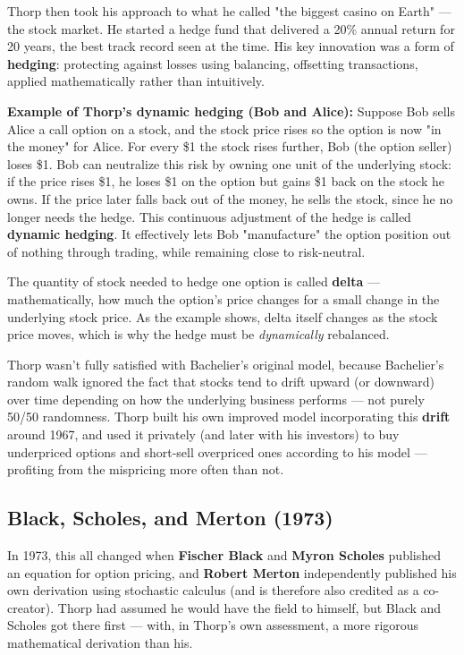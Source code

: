 \documentclass[12pt,openany]{book}
\theoremstyle{definition}
\theoremstyle{remark}
\begin{document}
Thorp then took his approach to what he called "the biggest casino on Earth" --- the stock market. He started a hedge fund that delivered a 20\% annual return for 20 years, the best track record seen at the time. His key innovation was a form of \textbf{hedging}: protecting against losses using balancing, offsetting transactions, applied mathematically rather than intuitively.

\textbf{Example of Thorp's dynamic hedging (Bob and Alice):} Suppose Bob sells Alice a call option on a stock, and the stock price rises so the option is now "in the money" for Alice. For every \$1 the stock rises further, Bob (the option seller) loses \$1. Bob can neutralize this risk by owning one unit of the underlying stock: if the price rises \$1, he loses \$1 on the option but gains \$1 back on the stock he owns. If the price later falls back out of the money, he sells the stock, since he no longer needs the hedge. This continuous adjustment of the hedge is called \textbf{dynamic hedging}. It effectively lets Bob "manufacture" the option position out of nothing through trading, while remaining close to risk-neutral.

The quantity of stock needed to hedge one option is called \textbf{delta} --- mathematically, how much the option's price changes for a small change in the underlying stock price. As the example shows, delta itself changes as the stock price moves, which is why the hedge must be \emph{dynamically} rebalanced.

Thorp wasn't fully satisfied with Bachelier's original model, because Bachelier's random walk ignored the fact that stocks tend to drift upward (or downward) over time depending on how the underlying business performs --- not purely 50/50 randomness. Thorp built his own improved model incorporating this \textbf{drift} around 1967, and used it privately (and later with his investors) to buy underpriced options and short-sell overpriced ones according to his model --- profiting from the mispricing more often than not.

\subsection{Black, Scholes, and Merton (1973)}

In 1973, this all changed when \textbf{Fischer Black} and \textbf{Myron Scholes} published an equation for option pricing, and \textbf{Robert Merton} independently published his own derivation using stochastic calculus (and is therefore also credited as a co-creator). Thorp had assumed he would have the field to himself, but Black and Scholes got there first --- with, in Thorp's own assessment, a more rigorous mathematical derivation than his.
\end{document}
